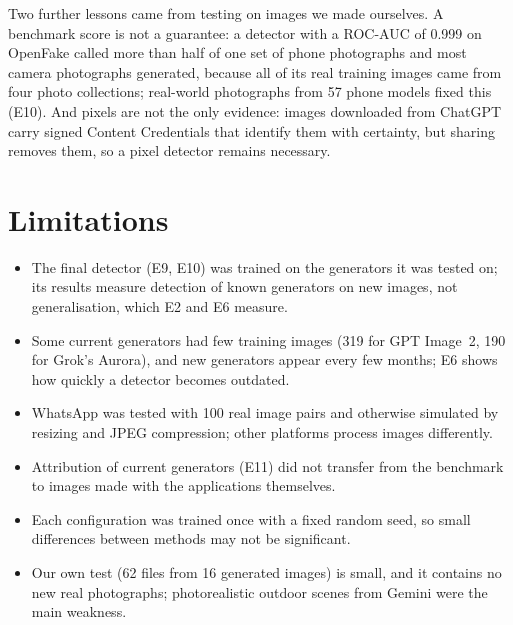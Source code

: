 \documentclass{mnnit}
\begin{document}
Two further lessons came from testing on images we made ourselves. A
benchmark score is not a guarantee: a detector with a \mbox{ROC-AUC} of 0.999
on OpenFake called more than half of one set of phone photographs and
most camera photographs generated, because all of its real training images came from four photo collections; real-world
photographs from 57 phone models fixed this (E10). And pixels are not the
only evidence: images downloaded from ChatGPT carry signed Content
Credentials that identify them with certainty, but sharing removes them,
so a pixel detector remains necessary.

\section{Limitations}
\begin{itemize}
  \item The final detector (E9, E10) was trained on the generators it was
        tested on; its results measure detection of known generators on
        new images, not generalisation, which E2 and E6 measure.
  \item Some current generators had few training images (319 for GPT
        Image~2, 190 for Grok's Aurora), and new generators appear every
        few months; E6 shows how quickly a detector becomes outdated.
  \item WhatsApp was tested with 100 real image pairs and otherwise
        simulated by resizing and JPEG compression; other platforms
        process images differently.
  \item Attribution of current generators (E11) did not transfer from
        the benchmark to images made with the applications themselves.
  \item Each configuration was trained once with a fixed random seed,
        so small differences between methods may not be significant.
  \item Our own test (62 files from 16 generated images) is small, and
        it contains no new real photographs; photorealistic outdoor scenes
        from Gemini were the main weakness.
\end{itemize}
\end{document}
